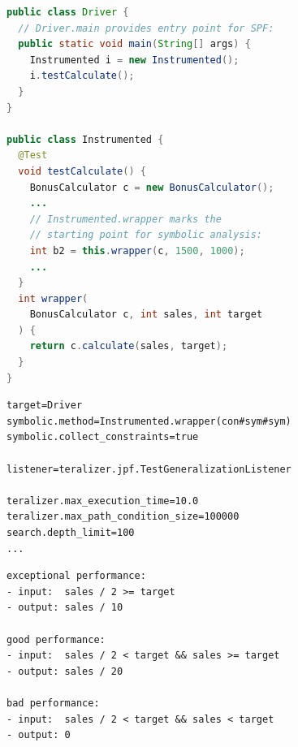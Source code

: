 {
\begin{genericfloat}[b]
\newpage{}
\noindent
\begin{minipage}[t]{0.48\textwidth}

\begin{lstlisting}[language=Java, caption={Driver and instrumented test class used for specification extraction of the \textit{good performance} case.}, label=lst:instrumented-test]
public class Driver {
  // Driver.main provides entry point for SPF:
  public static void main(String[] args) {
    Instrumented i = new Instrumented();
    i.testCalculate();
  }
}

public class Instrumented {
  @Test
  void testCalculate() {
    BonusCalculator c = new BonusCalculator();
    ...
    // Instrumented.wrapper marks the
    // starting point for symbolic analysis:
    int b2 = this.wrapper(c, 1500, 1000);
    ...
  }
  int wrapper(
    BonusCalculator c, int sales, int target
  ) {
    return c.calculate(sales, target);
  }
}
\end{lstlisting}

\end{minipage}
\hfill
\begin{minipage}[t]{0.48\textwidth}

\begin{lstlisting}[caption={\ToolSPFLong{} configuration used for specification extraction of the \textit{good performance} case.}, label=lst:jpf-config]
target=Driver
symbolic.method=Instrumented.wrapper(con#sym#sym)
symbolic.collect_constraints=true

listener=teralizer.jpf.TestGeneralizationListener

teralizer.max_execution_time=10.0
teralizer.max_path_condition_size=100000
search.depth_limit=100
...
\end{lstlisting}

\begin{lstlisting}[caption={Input/Output specifications extracted for the MUT calls in the \texttt{testCalculate} method.}, label=lst:extracted-specs]
exceptional performance:
- input:  sales / 2 >= target
- output: sales / 10

good performance:
- input:  sales / 2 < target && sales >= target
- output: sales / 20

bad performance:
- input:  sales / 2 < target && sales < target
- output: 0
\end{lstlisting}

\end{minipage}
\end{genericfloat}
}


